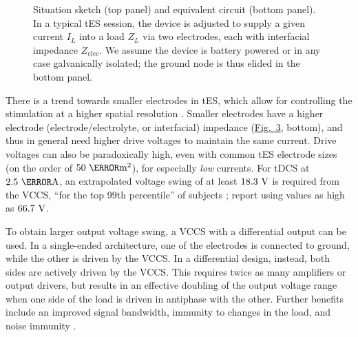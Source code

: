 \documentclass[conference]{IEEEtran}
\newcommand{\brieffiglink}[1]{\hyperref[#1]{Fig.~\ref*{#1}}}
\begin{document}
\begin{figure}[bt]
	\begin{subfigure}{\textwidth}
        
\hspace{-4.8cm}
        \caption*{}
        \label{fig:situation_sketch1}
    \end{subfigure}

	\begin{subfigure}{\textwidth}

\hspace{-4.5cm}\makebox[\textwidth][c]{%

}
        \caption*{\small}
        \label{fig:situation_sketch2}
    \end{subfigure}
\caption{\small Situation sketch (top panel) and equivalent circuit (bottom panel). In a typical tES session, the device is adjusted to supply a given current $I_L$ into a load $Z_L$ via two electrodes, each with interfacial impedance $Z_{elec}$. We assume the device is battery powered or in any case galvanically isolated; the ground node is thus elided in the bottom panel.}
\label{fig:situation_sketch}
\end{figure}

There is a trend towards smaller electrodes in tES, which allow for controlling the stimulation at a higher spatial resolution \cite{pmid23031743}. Smaller electrodes have a higher electrode (electrode/electrolyte, or interfacial) impedance (\brieffiglink{fig:situation_sketch}, bottom), and thus in general need higher drive voltages to maintain the same current. Drive voltages can also be paradoxically high, even with common tES electrode sizes (on the order of $50~\centi\meter^2$), for especially \emph{low} currents. For tDCS at $2.5~\milli\ampere$, an extrapolated voltage swing of at least $18.3~\volt$ is required from the VCCS, ``for the top 99th percentile'' of subjects \cite{pmid25018056}; \cite{pmid20488204} report using values as high as $66.7~\volt$.

To obtain larger output voltage swing, a VCCS with a differential output can be used. In a single-ended architecture, one of the electrodes is connected to ground, while the other is driven by the VCCS. In a differential design, instead, both sides are actively driven by the VCCS. This requires twice as many amplifiers or output drivers, but results in an effective doubling of the output voltage range when one side of the load is driven in antiphase with the other. Further benefits include an improved signal bandwidth, immunity to changes in the load, and noise immunity \cite{pmid24880419}.
\end{document}
